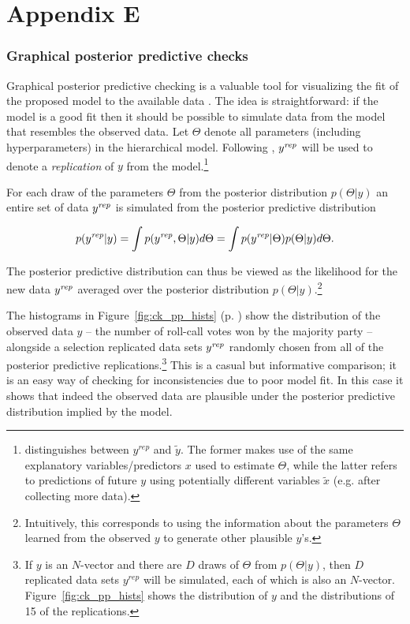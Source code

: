 \chapter*{Appendix E}\label{AppendixE}
\vspace{-1.75cm}
\subsection{Graphical posterior predictive checks}

Graphical posterior predictive checking is a valuable tool for visualizing the fit of the proposed model 
to the available data . The idea is straightforward: if the model is a good fit 
then it should be possible to simulate data from the model that resembles the observed data. Let $\Theta$ 
denote all parameters (including hyperparameters) in the hierarchical model. Following 
 , $y^{\it rep}$ will be used to denote a {\it replication} of $y$ from the model.\footnote{ distinguishes between $y^{rep}$ and $\tilde{y}$. The former 
 makes use of the same explanatory variables/predictors $x$ used to estimate $\Theta$, while the latter 
 refers to predictions of future $y$ using potentially different variables $\tilde{x}$ (e.g. after collecting more data).}

For each draw of the parameters $\Theta$ from the posterior distribution $p(\Theta | y)$ an entire set 
of data $y^{\it rep} $ is simulated from the posterior predictive distribution

\begin{equation*}
 p(y^{\it rep} | y) = \int p(y^{\it rep}, \Theta | y) d\Theta = \int p(y^{\it rep} | \Theta) p(\Theta | y) d\Theta.
\end{equation*}

\noindent The posterior predictive distribution can thus be viewed as the likelihood for the new data 
$y^{\it rep}$ averaged over the posterior distribution  $p(\Theta | y)$.\footnote{
Intuitively, this corresponds to using the information about the parameters $\Theta$ learned from 
the observed $y$ to generate other plausible $y$'s.}

The histograms in Figure~\ref{fig:ck_pp_hists} (p. \pageref{fig:ck_pp_hists}) show the 
distribution of the observed data $y$ -- the number of roll-call votes won by the majority party 
-- alongside a selection replicated data sets $y^{\it rep}$ randomly chosen from all of the posterior 
predictive replications.\footnote{If $y$ is an $N$-vector and there are $D$ draws of 
$\Theta$ from $p(\Theta | y)$, then $D$ replicated data sets $y^{rep}$ will be simulated, 
each of which is also an $N$-vector. Figure~\ref{fig:ck_pp_hists} shows the distribution of $y$ and the
distributions of 15 of the replications.} This is a casual but informative comparison; it is an easy way 
of checking for inconsistencies due to poor model fit. In this case it shows that indeed the observed 
data are plausible under the posterior predictive distribution implied by the model. 


